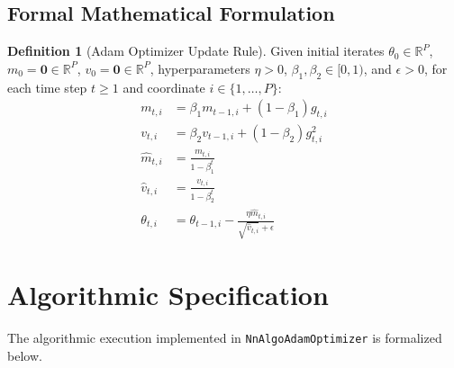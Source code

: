 \documentclass[11pt,a4paper]{article}
\theoremstyle{definition}
\newtheorem{definition}{Definition}[section]
\begin{document}
\subsection{Formal Mathematical Formulation}
\begin{definition}[Adam Optimizer Update Rule]
Given initial iterates $\theta_0 \in \mathbb{R}^P$, $m_0 = \mathbf{0} \in \mathbb{R}^P$, $v_0 = \mathbf{0} \in \mathbb{R}^P$, hyperparameters $\eta > 0$, $\beta_1, \beta_2 \in [0, 1)$, and $\epsilon > 0$, for each time step $t \ge 1$ and coordinate $i \in \{1, \dots, P\}$:
\begin{align}
m_{t, i} &= \beta_1 m_{t-1, i} + (1 - \beta_1) g_{t, i} \label{eq:adam_m} \\
v_{t, i} &= \beta_2 v_{t-1, i} + (1 - \beta_2) g_{t, i}^2 \label{eq:adam_v} \\
\hat{m}_{t, i} &= \frac{m_{t, i}}{1 - \beta_1^t} \label{eq:adam_mhat} \\
\hat{v}_{t, i} &= \frac{v_{t, i}}{1 - \beta_2^t} \label{eq:adam_vhat} \\
\theta_{t, i} &= \theta_{t-1, i} - \frac{\eta \hat{m}_{t, i}}{\sqrt{\hat{v}_{t, i}} + \epsilon} \label{eq:adam_theta}
\end{align}
\end{definition}

\section{Algorithmic Specification}

The algorithmic execution implemented in \texttt{NnAlgoAdamOptimizer} is formalized below.
\end{document}
